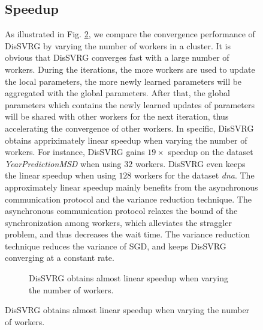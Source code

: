 \documentclass[preprint,review,11pt,a4paper]{elsarticle}
\begin{document}
\begin{figure}
\subsection{Speedup}
As illustrated in Fig. \ref{figure_evaluation2_speedup}, we compare the convergence performance of DisSVRG by varying the number of workers in a cluster. It is obvious that DisSVRG converges fast with a large number of workers. During the iterations, the more workers are used to update the local parameters, the more newly learned parameters will be aggregated with the global parameters. After that, the global parameters which contains the newly learned updates of parameters will be shared with other workers for the next iteration, thus accelerating the convergence of other workers. In specific, DisSVRG obtains appriximately linear speedup when varying the number of workers. For instance, DisSVRG gains $19\times$ speedup on the dataset \emph{YearPredictionMSD} when using $32$ workers. DisSVRG even keeps the linear speedup when using $128$ workers for the dataset \emph{dna}. The approximately linear speedup mainly benefits from the asynchronous communication protocol and the variance reduction technique. The asynchronous communication protocol relaxes the bound of the synchronization among workers, which alleviates the straggler problem, and thus decreases the wait time. The variance reduction technique reduces the variance of SGD, and keeps DisSVRG converging at a constant rate.

\begin{figure}
\centering
{}
\caption{DisSVRG obtains almost linear speedup when varying the number of workers.}
\label{figure_evaluation2_speedup}
\end{figure}


\end{figure}
\end{document}
